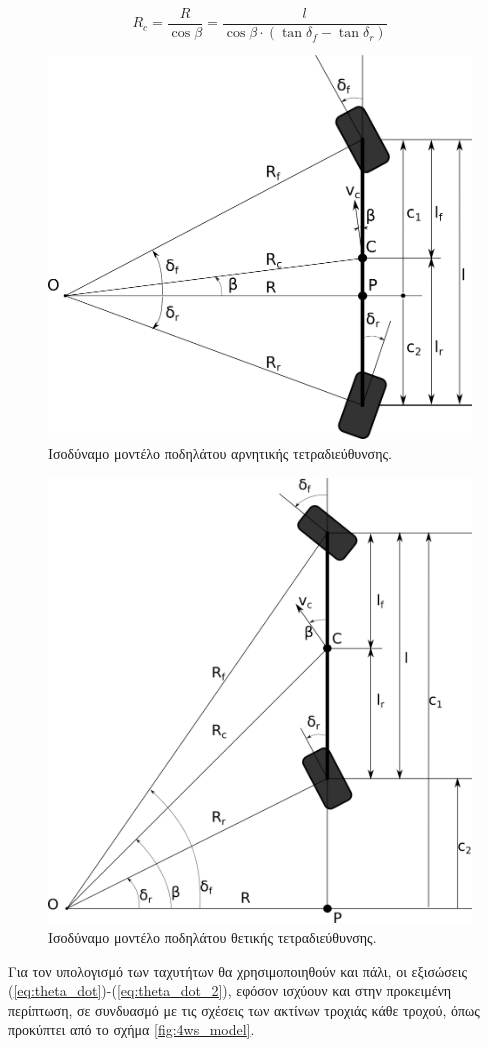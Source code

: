 {\begin{equation}
	R_c = \frac{R}{\cos{\beta}} = \frac{l}{\cos{\beta} \cdot (\tan{\delta_f} - \tan{\delta_r})}
\end{equation}

\begin{figure}[!ht]
	\centering
	\includegraphics[width=0.6\linewidth]{Chapters/Chapter2/Figures/4ws_bicycle.png}
	\caption{Ισοδύναμο μοντέλο ποδηλάτου αρνητικής τετραδιεύθυνσης.}
	\label{fig:4ws_bicycle}
\end{figure}

\begin{figure}[!ht]
	\centering
	\includegraphics[width=0.6\linewidth]{Chapters/Chapter2/Figures/pos_4ws_bicycle_model.png}
	\caption{Ισοδύναμο μοντέλο ποδηλάτου θετικής τετραδιεύθυνσης.}
	\label{fig:pos_4ws_bicycle_model}
\end{figure}

\bigskip
Για τον υπολογισμό των ταχυτήτων θα χρησιμοποιηθούν και πάλι, οι εξισώσεις (\ref{eq:theta_dot})-(\ref{eq:theta_dot_2}), εφόσον ισχύουν και στην προκειμένη περίπτωση, σε συνδυασμό με τις σχέσεις των ακτίνων τροχιάς κάθε τροχού, όπως προκύπτει από το σχήμα \ref{fig:4ws_model}.

}
